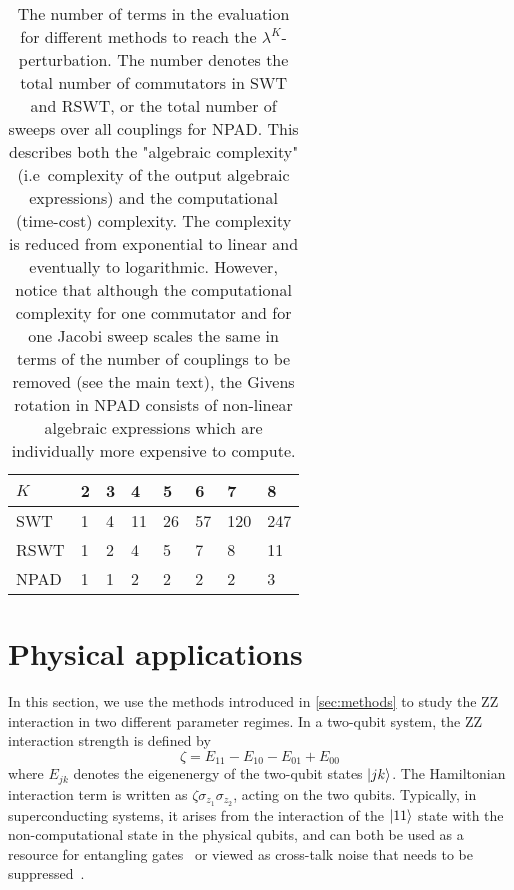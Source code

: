 \documentclass[%
 reprint,
 amsmath,amssymb,
 aps,
pra,
noeprint,
superscriptaddress,
]{revtex4-2}
\begin{document}
{
\setlength\heavyrulewidth{0.35ex}
\begin{table}[h]
\begin{tabular}{ l  C{0.53cm} C{0.53cm} C{0.53cm} C{0.53cm} C{0.53cm}C{0.53cm}C{0.53cm}}

\toprule
$K$ & 2 & 3 & 4 & 5  & 6  & 7  & 8   \\
\midrule
SWT   & 1 & 4 & 11 & 26  & 57  & 120 & 247  \\[0.1cm]
RSWT   & 1 & 2 & 4 & 5  & 7  & 8 & 11  \\[0.1cm]
NPAD  & 1 & 1 & 2  & 2  & 2  & 2 & 3 \\
\bottomrule
\end{tabular}
\caption{
The number of terms in the evaluation for different methods to reach the $\lambda^K$-perturbation.
The number denotes the total number of commutators in SWT and RSWT, or the total number of sweeps over all couplings for NPAD. This describes both the "algebraic complexity" (i.e~complexity of the output algebraic expressions) and the computational (time-cost) complexity.
The complexity is reduced from exponential to linear and eventually to logarithmic.
However, notice that although the computational complexity for one commutator and for one Jacobi sweep scales the same in terms of the number of couplings to be removed (see the main text), the Givens rotation in NPAD consists of non-linear algebraic expressions which are individually more expensive to compute.
\label{tab:number of commutators}
}
\end{table}
}

\section{Physical applications}
\label{sec:applications}
In this section, we use the methods introduced in \cref{sec:methods} to study the ZZ interaction in two different parameter regimes.
In a two-qubit system, the ZZ interaction strength is defined by
\begin{equation}
    \label{eq:ZZ interaction def}
    \zeta = E_{11} - E_{10} - E_{01} + E_{00}  
\end{equation}
where $E_{jk}$ denotes the eigenenergy of the two-qubit states $\ket{jk}$.
The Hamiltonian interaction term is written as $\zeta\sigma_{z_1}\sigma_{z_2}$, acting on the two qubits.
Typically, in superconducting systems, it arises from the interaction of the $\ket{11}$ state with the non-computational state in the physical qubits, and can both be used as a resource for entangling gates~\cite{Dicarlo2009,Chen2014,Barends2014,Rol2019} or viewed as cross-talk noise that needs to be suppressed~\cite{Zhao2020,Ku2020,Xu2020,Sete2021,Xu2020zz,Zhao2020a,Stehlik2021,Sung2020,kandala2021,Mundada2019,Collodo2020,Chu2021,Jin2021,Finck2021,Wei2021,Mitchell2021,Xiong2021}.
\end{document}
